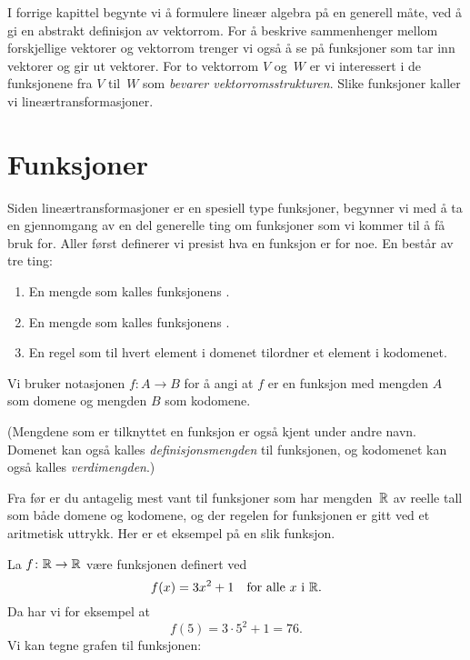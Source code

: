 

\label{ch:lineartransformasjoner}

I forrige kapittel begynte vi å formulere lineær algebra på en
generell måte, ved å gi en abstrakt definisjon av vektorrom.  For å
beskrive sammenhenger mellom forskjellige vektorer og vektorrom
trenger vi også å se på funksjoner som tar inn vektorer og gir ut
vektorer.  For to vektorrom $V$ og~$W$ er vi interessert i de
funksjonene fra $V$ til~$W$ som \emph{bevarer vektorromsstrukturen}.
Slike funksjoner kaller vi lineærtransformasjoner.


\section*{Funksjoner}

Siden lineærtransformasjoner er en spesiell type funksjoner, begynner
vi med å ta en gjennomgang av en del generelle ting om funksjoner som
vi kommer til å få bruk for.  Aller først definerer vi presist hva en
funksjon er for noe.  En  består av tre ting:
\begin{enumerate}
\item En mengde som kalles funksjonens .
\item En mengde som kalles funksjonens .
\item En regel som til hvert element i domenet tilordner et element i
kodomenet.
\end{enumerate}
Vi bruker notasjonen $f \colon A \to B$ for å angi at $f$ er en
funksjon med mengden $A$ som domene og mengden $B$ som kodomene.

(Mengdene som er tilknyttet en funksjon er også kjent under andre
navn.  Domenet kan også kalles \emph{definisjonsmengden} til
funksjonen, og kodomenet kan også kalles \emph{verdimengden}.)

Fra før er du antagelig mest vant til funksjoner som har mengden~$\mathbb{R}$
av reelle tall som både domene og kodomene, og der regelen for
funksjonen er gitt ved et aritmetisk uttrykk.  Her er et eksempel på
en slik funksjon.

\begin{ex}
\label{ex:funksjon1}
La $f \colon \mathbb{R} \to \mathbb{R}$ være funksjonen definert ved
\[
f(x) = 3x^2 + 1
\quad\text{for alle $x$ i~$\mathbb{R}$.}
\]
Da har vi for eksempel at
\[
f(5) = 3 \cdot 5^2 + 1 = 76.
\]
Vi kan tegne grafen til funksjonen:
\begin{center}
\qedhere
\end{center}
\end{ex}

